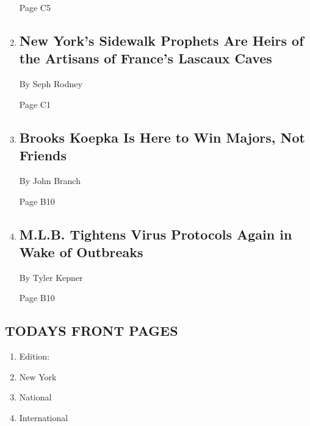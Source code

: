 \begin{enumerate}
  Page C5
\item
  \href{/2020/08/06/arts/design/street-art-nyc-george-floyd.html}{}

  \hypertarget{new-yorks-sidewalk-prophets-are-heirs-of-the-artisans-of-frances-lascaux-caves}{%
  \subsection{New York's Sidewalk Prophets Are Heirs of the Artisans of
  France's Lascaux
  Caves}\label{new-yorks-sidewalk-prophets-are-heirs-of-the-artisans-of-frances-lascaux-caves}}

  By Seph Rodney

  Page C1
\item
  \href{/2020/08/07/sports/brooks-koepka-pga-championship.html}{}

  \hypertarget{brooks-koepka-is-here-to-win-majors-not-friends}{%
  \subsection{Brooks Koepka Is Here to Win Majors, Not
  Friends}\label{brooks-koepka-is-here-to-win-majors-not-friends}}

  By John Branch

  Page B10
\item
  \href{/2020/08/06/sports/baseball/mlb-safety-protocols.html}{}

  \hypertarget{mlb-tightens-virus-protocols-again-in-wake-of-outbreaks}{%
  \subsection{M.L.B. Tightens Virus Protocols Again in Wake of
  Outbreaks}\label{mlb-tightens-virus-protocols-again-in-wake-of-outbreaks}}

  By Tyler Kepner

  Page B10
\end{enumerate}

\hypertarget{todays-front-pages}{%
\subsection{TODAYS FRONT PAGES}\label{todays-front-pages}}

\begin{enumerate}
\def\labelenumi{\arabic{enumi}.}
\tightlist
\item
  Edition:
\item
  New York
\item
  National
\item
  International
\end{enumerate}

